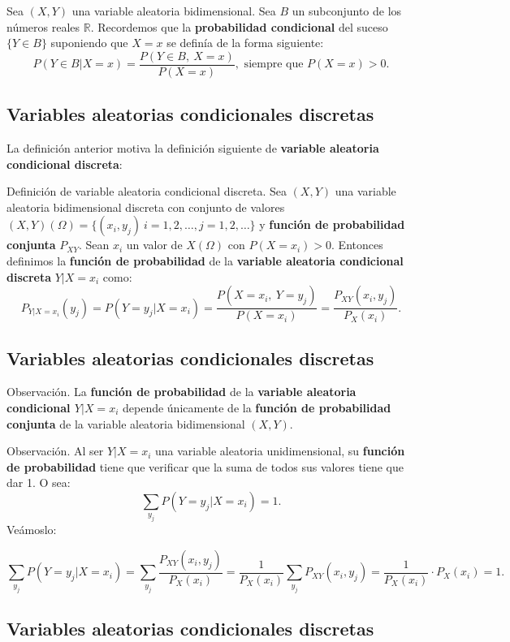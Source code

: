 \documentclass[]{book}
\begin{document}
Sea \((X,Y)\) una variable aleatoria bidimensional. Sea \(B\) un subconjunto de los números reales \(\mathbb{R}\). Recordemos que la \textbf{probabilidad condicional} del suceso \(\{Y\in B\}\) suponiendo que \(X=x\) se definía de la forma siguiente:
\[
P(Y\in B|X=x)=\frac{P(Y\in B,\ X=x)}{P(X=x)}, \mbox{ siempre que }P(X=x)>0.
\]

\hypertarget{variables-aleatorias-condicionales-discretas-1}{%
\subsection{Variables aleatorias condicionales discretas}\label{variables-aleatorias-condicionales-discretas-1}}

La definición anterior motiva la definición siguiente de \textbf{variable aleatoria condicional discreta}:

Definición de variable aleatoria condicional discreta.
Sea \((X,Y)\) una variable aleatoria bidimensional discreta con conjunto de valores \((X,Y)(\Omega)=\{(x_i,y_j)\ i=1,2,\ldots, j=1,2,\ldots\}\) y \textbf{función de probabilidad conjunta} \(P_{XY}\). Sean \(x_i\) un valor de \(X(\Omega)\) con \(P(X=x_i)>0\). Entonces definimos la \textbf{función de probabilidad} de la \textbf{variable aleatoria condicional discreta} \(Y|X=x_i\) como:
\[
P_{Y|X=x_i}(y_j)=P(Y=y_j|X=x_i)=\frac{P(X=x_i,\ Y=y_j)}{P(X=x_i)}=\frac{P_{XY}(x_i,y_j)}{P_X(x_i)}.
\]

\hypertarget{variables-aleatorias-condicionales-discretas-2}{%
\subsection{Variables aleatorias condicionales discretas}\label{variables-aleatorias-condicionales-discretas-2}}

Observación.
La \textbf{función de probabilidad} de la \textbf{variable aleatoria condicional \(Y|X=x_i\)} depende únicamente de la \textbf{función de probabilidad conjunta} de la variable aleatoria bidimensional \((X,Y)\).

Observación.
Al ser \(Y|X=x_i\) una variable aleatoria unidimensional, su \textbf{función de probabilidad} tiene que verificar que la suma de todos sus valores tiene que dar 1. O sea:
\[
\sum_{y_j} P(Y=y_j|X=x_i)=1.
\]
Veámoslo:

\[
\sum_{y_j} P(Y=y_j|X=x_i)=\sum_{y_j} \frac{P_{XY}(x_i,y_j)}{P_X(x_i)}=\frac{1}{P_X(x_i)}\sum_{y_j} P_{XY}(x_i,y_j) =\frac{1}{P_X(x_i)}\cdot P_X(x_i)=1.
\]

\hypertarget{variables-aleatorias-condicionales-discretas-3}{%
\subsection{Variables aleatorias condicionales discretas}\label{variables-aleatorias-condicionales-discretas-3}}
\end{document}
